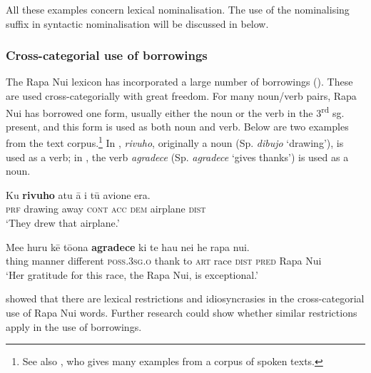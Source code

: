 All these examples concern lexical nominalisation. The use of the nominalising suffix in syntactic nominalisation will be discussed in  below.

\subsubsection[Cross{}-categorial use of borrowings]{Cross-categorial use of borrowings}\label{sec:3.2.2.3}
The Rapa Nui lexicon has incorporated a large number of  borrowings (). These are used cross-categorially with great freedom. For many  noun/verb pairs, Rapa Nui has borrowed one form, usually either the noun or the verb in the 3\textsuperscript{rd} sg. present, and this form is used as both noun and verb. Below are two examples from the text corpus.\footnote{\label{fn:103}See also \citet{Makihara2001Adaptation}, who gives many examples from a corpus of spoken texts.} In , \textit{rivuho}, originally a noun (Sp. \textit{dibujo} ‘drawing’), is used as a verb; in , the verb \textit{agradece} (Sp. \textit{agradece} ‘gives thanks’) is used as a noun.

\ea\label{ex:3.15}
\gll Ku \textbf{rivuho} atu {\ꞌ}ā i tū {\ꞌ}avione era.\\
\textsc{prf} drawing away \textsc{cont} \textsc{acc} \textsc{dem} airplane \textsc{dist}\\

\glt 
‘They drew that airplane.’ \textstyleExampleref{[R379.057]} 
\z

\ea\label{ex:3.16}
\gll Me{\ꞌ}e huru kē tō{\ꞌ}ona \textbf{agradece} ki te hau nei he rapa nui. \\
thing manner different \textsc{poss.3sg.o} thank to \textsc{art} race \textsc{dist} \textsc{pred} Rapa Nui \\

\glt
‘Her gratitude for this race, the Rapa Nui, is exceptional.’  
\z

 showed that there are lexical restrictions and idiosyncrasies in the cross-cat\-e\-go\-rial use of Rapa Nui words. Further research could show whether similar restrictions apply in the use of borrowings. 

